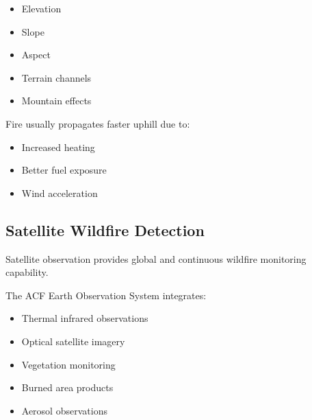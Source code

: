 \begin{itemize}

\item Elevation

\item Slope

\item Aspect

\item Terrain channels

\item Mountain effects

\end{itemize}


Fire usually propagates faster uphill due to:

\begin{itemize}

\item Increased heating

\item Better fuel exposure

\item Wind acceleration

\end{itemize}


\subsection{Satellite Wildfire Detection}

Satellite observation provides global and continuous wildfire
monitoring capability.

The ACF Earth Observation System integrates:

\begin{itemize}

\item Thermal infrared observations

\item Optical satellite imagery

\item Vegetation monitoring

\item Burned area products

\item Aerosol observations

\end{itemize}


